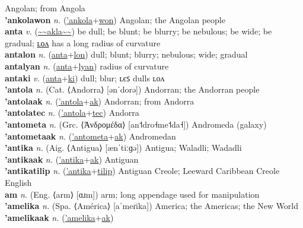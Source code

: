 Angolan; from Angola \label{'ankolaak} \\
\textbf{'ankolawon} \textit{n.} (\hyperref['ankola]{'ankola}+\hyperref[won]{won})
Angolan; the Angolan people \label{'ankolawon} \\
\textbf{anta} \textit{v.} (\hyperref[akla]{\~{}\~{}akla\~{}\~{}})
be dull; be blunt; be blurry; be nebulous; be wide; be gradual; \hyperref[antalon]{ʟᴏᴧ} has a long radius of curvature \label{anta} \\
\textbf{antalon} \textit{n.} (\hyperref[anta]{anta}+\hyperref[lon]{lon})
dull; blunt; blurry; nebulous; wide; gradual \label{antalon} \\
\textbf{antalyan} \textit{n.} (\hyperref[anta]{anta}+\hyperref[lyan]{lyan})
radius of curvature \label{antalyan} \\
\textbf{antaki} \textit{v.} (\hyperref[anta]{anta}+\hyperref[ki]{ki})
dull; blur; ʟєꜱ dulls ʟᴏᴧ \label{antaki} \\
\textbf{'antola} \textit{n.} (Cat. ⟨Andorra⟩ [ənˈdorə])
Andorran; the Andorran people \label{'antola} \\
\textbf{'antolaak} \textit{n.} (\hyperref['antola]{'antola}+\hyperref[ak]{ak})
Andorran; from Andorra \label{'antolaak} \\
\textbf{'antolatec} \textit{n.} (\hyperref['antola]{'antola}+\hyperref[tec]{tec})
Andorra \label{'antolatec} \\
\textbf{'antometa} \textit{n.} (Grc. ⟨Ἀνδρομέδα⟩ [an˦dro˧me˦da˧])
Andromeda (galaxy) \label{'antometa} \\
\textbf{'antometaak} \textit{n.} (\hyperref['antometa]{'antometa}+\hyperref[ak]{ak})
Andromedan \label{'antometaak} \\
\textbf{'antika} \textit{n.} (Aig. ⟨Antigua⟩ [ænˈtiːɡə])
Antigua; Waladli; Wadadli \label{'antika} \\
\textbf{'antikaak} \textit{n.} (\hyperref['antika]{'antika}+\hyperref[ak]{ak})
Antiguan \label{'antikaak} \\
\textbf{'antikatilip} \textit{n.} (\hyperref['antika]{'antika}+\hyperref[tilip]{tilip})
Antiguan Creole; Leeward Caribbean Creole English \label{'antikatilip} \\
\textbf{am} \textit{n.} (Eng. ⟨arm⟩ [ɑɹm])
arm; long appendage used for manipulation \label{am} \\
\textbf{'amelika} \textit{n.} (Spa. ⟨América⟩ [aˈmeɾika])
America; the Americas; the New World \label{'amelika} \\
\textbf{'amelikaak} \textit{n.} (\hyperref['amelika]{'amelika}+\hyperref[ak]{ak})

